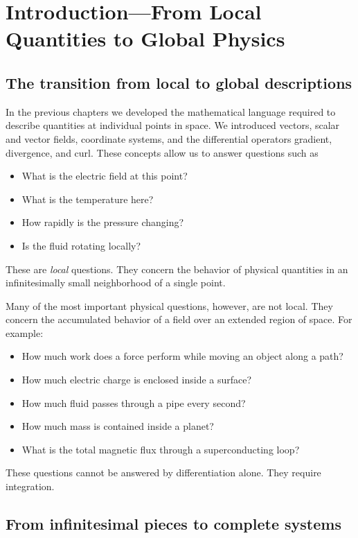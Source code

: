 \section{Introduction---From Local Quantities to Global Physics}
\label{sec:local-to-global-physics}

\subsection{The transition from local to global descriptions}

In the previous chapters we developed the mathematical language required to
describe quantities at individual points in space. We introduced vectors,
scalar and vector fields, coordinate systems, and the differential operators
gradient, divergence, and curl. These concepts allow us to answer questions
such as

\begin{itemize}
  \item What is the electric field at this point?
  \item What is the temperature here?
  \item How rapidly is the pressure changing?
  \item Is the fluid rotating locally?
\end{itemize}

These are \emph{local} questions. They concern the behavior of physical
quantities in an infinitesimally small neighborhood of a single point.

Many of the most important physical questions, however, are not local. They
concern the accumulated behavior of a field over an extended region of space.
For example:

\begin{itemize}
  \item How much work does a force perform while moving an object along a path?
  \item How much electric charge is enclosed inside a surface?
  \item How much fluid passes through a pipe every second?
  \item How much mass is contained inside a planet?
  \item What is the total magnetic flux through a superconducting loop?
\end{itemize}

These questions cannot be answered by differentiation alone. They require
integration.

\subsection{From infinitesimal pieces to complete systems}

